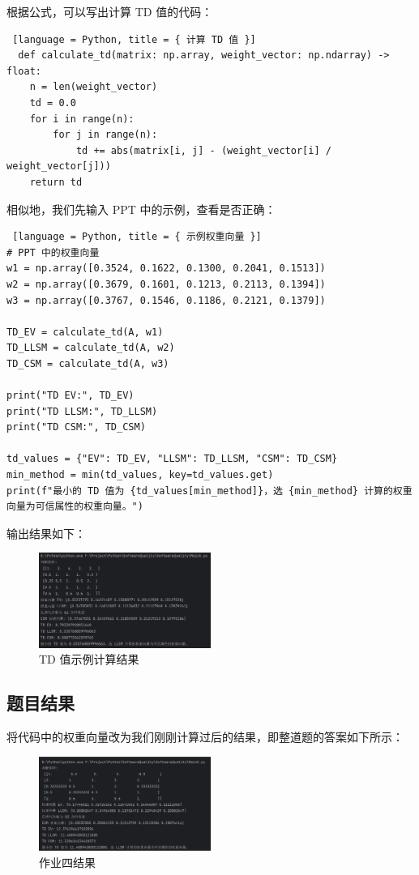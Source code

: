 根据公式，可以写出计算 TD 值的代码：

\begin{lstlisting} [language = Python, title = { 计算 TD 值 }]
  def calculate_td(matrix: np.array, weight_vector: np.ndarray) -> float:
    n = len(weight_vector)
    td = 0.0
    for i in range(n):
        for j in range(n):
            td += abs(matrix[i, j] - (weight_vector[i] / weight_vector[j]))
    return td
\end{lstlisting}

相似地，我们先输入 PPT 中的示例，查看是否正确：

\begin{lstlisting} [language = Python, title = { 示例权重向量 }]
# PPT 中的权重向量
w1 = np.array([0.3524, 0.1622, 0.1300, 0.2041, 0.1513])
w2 = np.array([0.3679, 0.1601, 0.1213, 0.2113, 0.1394])
w3 = np.array([0.3767, 0.1546, 0.1186, 0.2121, 0.1379])

TD_EV = calculate_td(A, w1)
TD_LLSM = calculate_td(A, w2)
TD_CSM = calculate_td(A, w3)

print("TD EV:", TD_EV)
print("TD LLSM:", TD_LLSM)
print("TD CSM:", TD_CSM)

td_values = {"EV": TD_EV, "LLSM": TD_LLSM, "CSM": TD_CSM}
min_method = min(td_values, key=td_values.get)
print(f"最小的 TD 值为 {td_values[min_method]}，选 {min_method} 计算的权重向量为可信属性的权重向量。")
\end{lstlisting}

输出结果如下：

\begin{figure} [H]
  \centering
  \includegraphics[width=0.5\textwidth]{img6/TDExample.png}
  \caption{TD 值示例计算结果}
\end{figure}

\subsection{题目结果}

将代码中的权重向量改为我们刚刚计算过后的结果，即整道题的答案如下所示：

\begin{figure} [H]
  \centering
  \includegraphics[width=0.5\textwidth]{img6/Homework4Result.png}
  \caption{作业四结果}
\end{figure}

